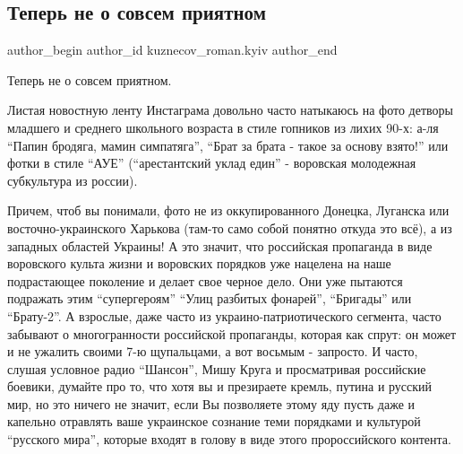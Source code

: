 
 
 
 
 
 
\subsection{Теперь не о совсем приятном}
\label{sec:22_11_2021.fb.kuznecov_roman.kyiv.1.ne_o_sovsem_prijatnom}
 
\ifcmt
 author_begin
   author_id kuznecov_roman.kyiv
 author_end
\fi

Теперь не о совсем приятном.

Листая новостную ленту Инстаграма довольно часто натыкаюсь на фото детворы
младшего и среднего школьного возраста в стиле гопников из лихих 90-х: а-ля
\enquote{Папин бродяга, мамин симпатяга}, \enquote{Брат за брата - такое за основу взято!} или
фотки в стиле \enquote{АУЕ} (\enquote{арестантский уклад един} - воровская молодежная
субкультура из россии).


Причем, чтоб вы понимали, фото не из оккупированного Донецка, Луганска или
восточно-украинского Харькова (там-то само собой понятно откуда это всё), а из
западных областей Украины! А это значит, что российская пропаганда в виде
воровского культа жизни и воровских порядков уже нацелена на наше подрастающее
поколение и делает свое черное дело. Они уже пытаются подражать этим
\enquote{супергероям} \enquote{Улиц разбитых фонарей}, \enquote{Бригады} или
\enquote{Брату-2}. А взрослые, даже часто из украино\hyp патриотического сегмента,
часто забывают о многогранности российской пропаганды, которая как спрут: он
может и не ужалить своими 7-ю щупальцами, а вот восьмым - запросто. И часто,
слушая условное радио \enquote{Шансон}, Мишу Круга и просматривая российские
боевики, думайте про то, что хотя вы и презираете кремль, путина и русский мир,
но это ничего не значит, если Вы позволяете этому яду пусть даже и капельно
отравлять ваше украинское сознание теми порядками и культурой \enquote{русского
мира}, которые входят в голову в виде этого пророссийского контента. 

